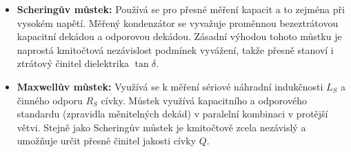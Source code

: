         \begin{itemize}
            \item \textbf{Scheringův můstek:} Používá se pro přesné měření kapacit a to zejména při vysokém napětí. Měřený kondenzátor se vyvažuje proměnnou bezeztrátovou kapacitní dekádou a odporovou dekádou. Zásadní výhodou tohoto můstku je naprostá kmitočtová nezávislost podmínek vyvážení, takže přesně stanoví i ztrátový činitel dielektrika $\tan \delta$.
            \item \textbf{Maxwellův můstek:} Využívá se k měření sériové náhradní indukčnosti $L_S$ a činného odporu $R_S$ cívky. Můstek využívá kapacitního a odporového standardu (zpravidla měnitelných dekád) v paralelní kombinaci v protější větvi. Stejně jako Scheringův můstek je kmitočtově zcela nezávislý a umožňuje určit přesně činitel jakosti cívky $Q$.
        \end{itemize}